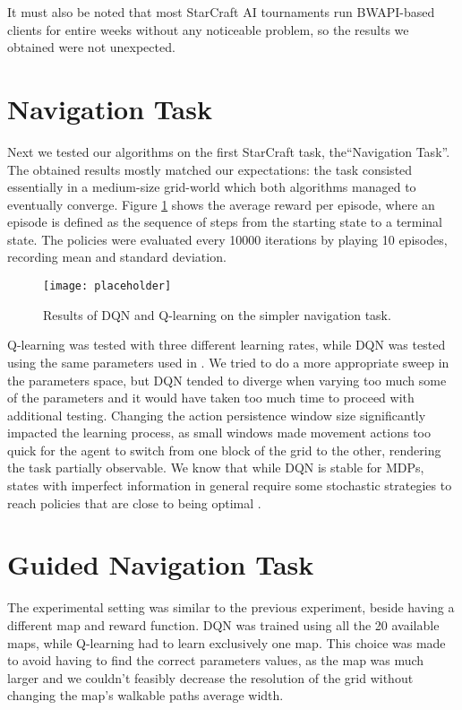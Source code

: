 It must also be noted that most StarCraft AI tournaments \citep{...} run
BWAPI-based clients for entire weeks without any noticeable problem, so the
results we obtained were not unexpected.

\section{Navigation Task}

Next we tested our algorithms on the first StarCraft task, the``Navigation
Task''. The obtained results mostly matched our expectations: the task consisted
essentially in a medium-size grid-world which both algorithms managed to
eventually converge. Figure \ref{fig:nav_task_results} shows the average reward
per episode, where an episode is defined as the sequence of steps from the
starting state to a terminal state. The policies were evaluated every 10000
iterations by playing 10 episodes, recording mean and standard deviation.

\begin{figure}[h]
    \centering
    \texttt{[image: placeholder]}
    \caption{Results of DQN and Q-learning on the simpler navigation task.}
    \label{fig:nav_task_results}
\end{figure}

Q-learning was tested with three different learning rates, while DQN was tested
using the same parameters used in \cite{mnih2015human}. We tried to do a more
appropriate sweep in the parameters space, but DQN tended to diverge when
varying too much some of the parameters and it would have taken too much time to
proceed with additional testing. Changing the action persistence window size
significantly impacted the learning process, as small windows made movement
actions too quick for the agent to switch from one block of the grid to the
other, rendering the task partially observable. We know that while DQN is stable
for MDPs, states with imperfect information in general require some stochastic
strategies to reach policies that are close to being optimal
\citep{heinrich2016deep}.

\section{Guided Navigation Task}

The experimental setting was similar to the previous experiment, beside having a
different map and reward function. DQN was trained using all the 20 available
maps, while Q-learning had to learn exclusively one map. This choice was made to
avoid having to find the correct parameters values, as the map was much larger
and we couldn't feasibly decrease the resolution of the grid without changing
the map's walkable paths average width.


